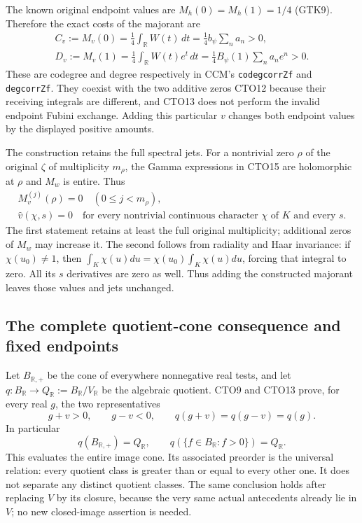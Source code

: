 The known original endpoint values are $M_h(0)=M_h(1)=1/4$
(GTK9). Therefore the exact costs of the majorant are
\begin{equation}\tag{CTO16}
\begin{gathered}
C_v:=M_v(0)=\tfrac14\int_{\mathbb R}W(t)\,dt
          =\tfrac14 b_\psi\sum_na_n>0,\\
D_v:=M_v(1)=\tfrac14\int_{\mathbb R}W(t)e^t\,dt
          =\tfrac14 B_\psi(1)\sum_na_ne^n>0.
\end{gathered}
\end{equation}
These are codegree and degree respectively in CCM's
\texttt{codegcorrZf} and \texttt{degcorrZf}. They coexist with the
two additive zeros CTO12 because their receiving integrals are
different, and CTO13 does not perform the invalid endpoint Fubini
exchange. Adding this particular $v$ changes both endpoint values
by the displayed positive amounts.

The construction retains the full spectral jets. For a nontrivial
zero $\rho$ of the original $\zeta$ of multiplicity $m_\rho$, the
Gamma expressions in CTO15 are holomorphic at $\rho$ and $M_w$
is entire. Thus
\begin{equation}\tag{CTO17}
\begin{gathered}
M_v^{(j)}(\rho)=0\quad(0\le j<m_\rho),\\
\widehat v(\chi,s)=0\quad\text{for every nontrivial continuous
 character }\chi\text{ of }K\text{ and every }s.
\end{gathered}
\end{equation}
The first statement retains at least the full original multiplicity;
additional zeros of $M_w$ may increase it. The second follows from
radiality and Haar invariance: if $\chi(u_0)\ne1$, then
$\int_K\chi(u)du=\chi(u_0)\int_K\chi(u)du$, forcing that integral
to zero. All its $s$ derivatives are zero as well. Thus adding the
constructed majorant leaves those values and jets unchanged.

\subsection{The complete quotient-cone consequence and fixed endpoints}

Let $B_{\mathbb R,+}$ be the cone of everywhere nonnegative
real tests, and let $q:B_{\mathbb R}\to
Q_{\mathbb R}:=B_{\mathbb R}/V_{\mathbb R}$ be the algebraic
quotient. CTO9 and CTO13 prove, for every real $g$, the two
representatives
\begin{equation}\tag{CTO18}
g+v>0,\qquad g-v<0,\qquad q(g+v)=q(g-v)=q(g).
\end{equation}
In particular
\[
q(B_{\mathbb R,+})=Q_{\mathbb R},\qquad
q(\{f\in B_{\mathbb R}:f>0\})=Q_{\mathbb R}.
\]
This evaluates the entire image cone. Its associated preorder is
the universal relation: every quotient class is greater than or
equal to every other one. It does not separate any distinct
quotient classes. The same conclusion holds after replacing
$V$ by its closure, because the very same actual antecedents
already lie in $V$; no new closed-image assertion is needed.

